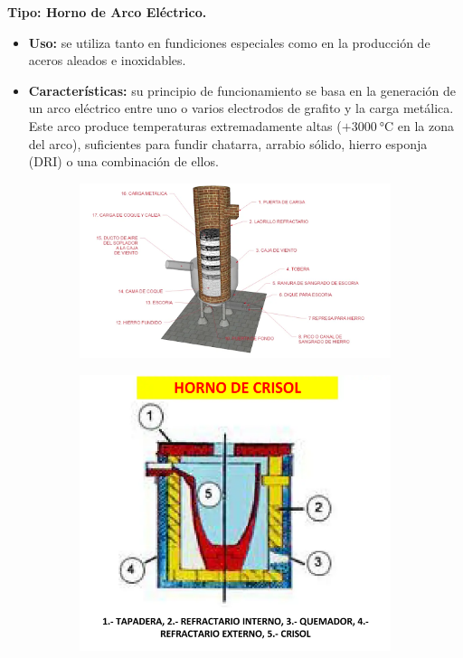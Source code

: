 \documentclass[12pt,a4paper]{article}
\begin{document}
\textbf{Tipo: Horno de Arco Eléctrico.}

\begin{itemize}
    \item \textbf{Uso:} se utiliza tanto en fundiciones especiales como en la producción de aceros aleados e inoxidables.
    \item \textbf{Características:} su principio de funcionamiento se basa en la generación de un arco eléctrico entre uno o varios electrodos de grafito y la carga metálica. Este arco produce temperaturas extremadamente altas ($+ \SI{3000}{\celsius}$ en la zona del arco), suficientes para fundir chatarra, arrabio sólido, hierro esponja (DRI) o una combinación de ellos.
\end{itemize}

\begin{figure}[h!]
    \centering
    \begin{subfigure}{0.9\textwidth}
        \centering
        \includegraphics[width=\textwidth]{Inagenes para latex/cubilote.png}
        \label{cubilote}
    \end{subfigure}
    \begin{subfigure}{0.45\textwidth}
        \centering
        \includegraphics[width=\textwidth]{Inagenes para latex/crisol.png}

\end{subfigure}
\end{figure}
\end{document}
